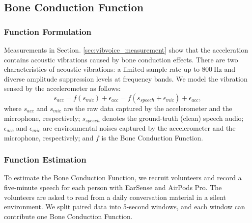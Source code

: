 \subsection{Bone Conduction Function}
\label{sec:vibvoice_bcf}
\subsubsection{Function Formulation}

Measurements in Section. \ref{sec:vibvoice_measurement} show that the acceleration contains acoustic vibrations caused by bone conduction effects. There are two characteristics of acoustic vibrations: a limited sample rate up to $800~\text{Hz}$ and diverse amplitude suppression levels at frequency bands. We model the vibration sensed by the accelerometer as follows: 
\begin{equation}
  s_{acc} = f(s_{mic}) + \epsilon_{acc}=f(s_{speech} + \epsilon_{mic}) + \epsilon_{acc},
  \label{math:transfer_function}
\end{equation}
where $s_{acc}$ and $s_{mic}$ are the raw data captured by the accelerometer and the microphone, respectively; $s_{speech}$ denotes the ground-truth (clean) speech audio; $\epsilon_{acc}$ and $\epsilon_{mic}$ are environmental noises captured by the accelerometer and the microphone, respectively; and $f$ is the Bone Conduction Function.

\subsubsection{Function Estimation}
\label{sec:vibvoice_function}
To estimate the Bone Conduction Function, we recruit volunteers and record a five-minute speech for each person with EarSense and AirPods Pro. The volunteers are asked to read from a daily conversation material \citep{Everyday75:online} in a silent environment. We split paired data into 5-second windows, and each window can contribute one Bone Conduction Function.

